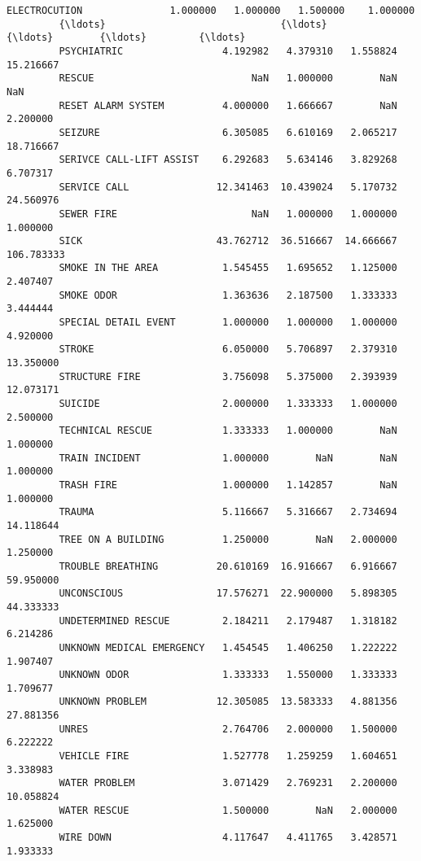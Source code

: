 \documentclass[11pt]{article}
\begin{document}
\begin{Verbatim}[commandchars=\\\{\}]
         ELECTROCUTION               1.000000   1.000000   1.500000    1.000000   
         {\ldots}                              {\ldots}        {\ldots}        {\ldots}         {\ldots}   
         PSYCHIATRIC                 4.192982   4.379310   1.558824   15.216667   
         RESCUE                           NaN   1.000000        NaN         NaN   
         RESET ALARM SYSTEM          4.000000   1.666667        NaN    2.200000   
         SEIZURE                     6.305085   6.610169   2.065217   18.716667   
         SERIVCE CALL-LIFT ASSIST    6.292683   5.634146   3.829268    6.707317   
         SERVICE CALL               12.341463  10.439024   5.170732   24.560976   
         SEWER FIRE                       NaN   1.000000   1.000000    1.000000   
         SICK                       43.762712  36.516667  14.666667  106.783333   
         SMOKE IN THE AREA           1.545455   1.695652   1.125000    2.407407   
         SMOKE ODOR                  1.363636   2.187500   1.333333    3.444444   
         SPECIAL DETAIL EVENT        1.000000   1.000000   1.000000    4.920000   
         STROKE                      6.050000   5.706897   2.379310   13.350000   
         STRUCTURE FIRE              3.756098   5.375000   2.393939   12.073171   
         SUICIDE                     2.000000   1.333333   1.000000    2.500000   
         TECHNICAL RESCUE            1.333333   1.000000        NaN    1.000000   
         TRAIN INCIDENT              1.000000        NaN        NaN    1.000000   
         TRASH FIRE                  1.000000   1.142857        NaN    1.000000   
         TRAUMA                      5.116667   5.316667   2.734694   14.118644   
         TREE ON A BUILDING          1.250000        NaN   2.000000    1.250000   
         TROUBLE BREATHING          20.610169  16.916667   6.916667   59.950000   
         UNCONSCIOUS                17.576271  22.900000   5.898305   44.333333   
         UNDETERMINED RESCUE         2.184211   2.179487   1.318182    6.214286   
         UNKNOWN MEDICAL EMERGENCY   1.454545   1.406250   1.222222    1.907407   
         UNKNOWN ODOR                1.333333   1.550000   1.333333    1.709677   
         UNKNOWN PROBLEM            12.305085  13.583333   4.881356   27.881356   
         UNRES                       2.764706   2.000000   1.500000    6.222222   
         VEHICLE FIRE                1.527778   1.259259   1.604651    3.338983   
         WATER PROBLEM               3.071429   2.769231   2.200000   10.058824   
         WATER RESCUE                1.500000        NaN   2.000000    1.625000   
         WIRE DOWN                   4.117647   4.411765   3.428571    1.933333   
         

\end{Verbatim}
\end{document}
